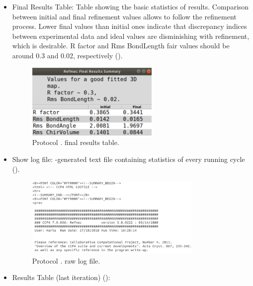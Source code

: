 \begin{itemize}
\begin{itemize}
\begin{figure}[H]
         \label{fig:app_protocol_refmac_4}
        \end{figure}
     \item Final Results Table:
     Table showing the basic statistics of  results. Comparison between initial and final refinement values allows to follow the refinement process. Lower final values than initial ones indicate that discrepancy indices between experimental data and ideal values are disminishing with refinement, which is desirable. R factor and Rms BondLength fair values should be around 0.3 and 0.02, respectively ().
        \begin{figure}[H]
         \centering 
         \captionsetup{width=.7\linewidth} 
         \includegraphics[width=0.60\textwidth]{Images_appendix/Fig130.pdf}
         \caption{Protocol .  final results table.}
         \label{fig:app_protocol_refmac_5}
        \end{figure}
     \item Show log file:
     -generated text file containing statistics of every  running cycle ().
        \begin{figure}[H]
         \centering 
         \captionsetup{width=.7\linewidth} 
         \includegraphics[width=0.80\textwidth]{Images_appendix/Fig131.pdf}
         \caption{Protocol .  raw log file.}
         \label{fig:app_protocol_refmac_6}
        \end{figure}
     \item Results Table (last iteration) ():

\end{itemize}
\end{itemize}
